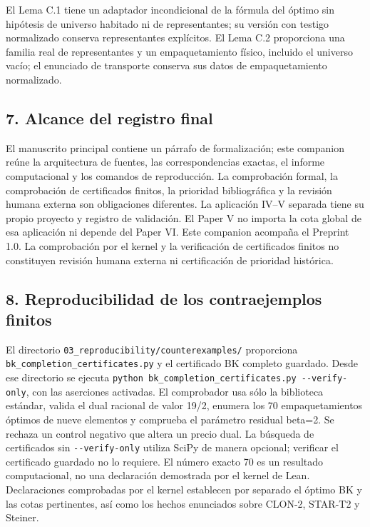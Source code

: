 \documentclass[spanish,11pt,a4paper]{article}
\begin{document}
El Lema C.1 tiene un adaptador incondicional de la fórmula del óptimo
sin hipótesis de universo habitado ni de representantes; su versión con
testigo normalizado conserva representantes explícitos. El Lema C.2
proporciona una familia real de representantes y un empaquetamiento
físico, incluido el universo vacío; el enunciado de transporte conserva
sus datos de empaquetamiento normalizado.

\subsection{7. Alcance del registro
final}\label{alcance-del-registro-final}

El manuscrito principal contiene un párrafo de formalización; este
companion reúne la arquitectura de fuentes, las correspondencias
exactas, el informe computacional y los comandos de reproducción. La
comprobación formal, la comprobación de certificados finitos, la
prioridad bibliográfica y la revisión humana externa son obligaciones
diferentes. La aplicación IV--V separada tiene su propio proyecto y
registro de validación. El Paper V no importa la cota global de esa
aplicación ni depende del Paper VI. Este companion acompaña el Preprint
1.0. La comprobación por el kernel y la verificación de certificados
finitos no constituyen revisión humana externa ni certificación de
prioridad histórica.

\subsection{8. Reproducibilidad de los contraejemplos
finitos}\label{reproducibilidad-de-los-contraejemplos-finitos}

El directorio \nolinkurl{03_reproducibility/counterexamples/} proporciona
\nolinkurl{bk_completion_certificates.py} y el certificado BK completo
guardado. Desde ese directorio se ejecuta
\texttt{python\ bk\_completion\_certificates.py\ -\/-verify-only}, con
las aserciones activadas. El comprobador usa sólo la biblioteca
estándar, valida el dual racional de valor 19/2, enumera los 70
empaquetamientos óptimos de nueve elementos y comprueba el parámetro
residual beta=2. Se rechaza un control negativo que altera un precio
dual. La búsqueda de certificados sin \texttt{-\/-verify-only} utiliza
SciPy de manera opcional; verificar el certificado guardado no lo
requiere. El número exacto 70 es un resultado computacional, no una
declaración demostrada por el kernel de Lean. Declaraciones comprobadas
por el kernel establecen por separado el óptimo BK y las cotas
pertinentes, así como los hechos enunciados sobre CLON-2, STAR-T2 y
Steiner.
\end{document}
